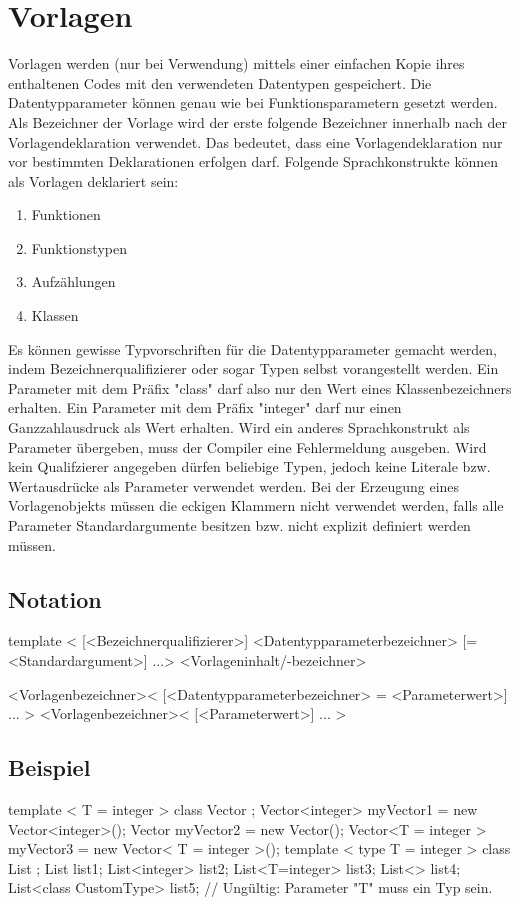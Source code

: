 \chapter{Vorlagen}
Vorlagen werden (nur bei Verwendung) mittels einer einfachen Kopie ihres enthaltenen Codes mit den verwendeten Datentypen gespeichert.
Die Datentypparameter können genau wie bei Funktionsparametern gesetzt werden.
Als Bezeichner der Vorlage wird der erste folgende Bezeichner innerhalb nach der Vorlagendeklaration verwendet.
Das bedeutet, dass eine Vorlagendeklaration nur vor bestimmten Deklarationen erfolgen darf.
Folgende Sprachkonstrukte können als Vorlagen deklariert sein:
\begin{enumerate}
\item Funktionen
\item Funktionstypen
\item Aufzählungen
\item Klassen
\end{enumerate}

Es können gewisse Typvorschriften für die Datentypparameter gemacht werden, indem Bezeichnerqualifizierer oder sogar Typen selbst vorangestellt werden.
Ein Parameter mit dem Präfix "class" darf also nur den Wert eines Klassenbezeichners erhalten.
Ein Parameter mit dem Präfix "integer" darf nur einen Ganzzahlausdruck als Wert erhalten.
Wird ein anderes Sprachkonstrukt als Parameter übergeben, muss der Compiler eine Fehlermeldung ausgeben.
Wird kein Qualifzierer angegeben dürfen beliebige Typen, jedoch keine Literale bzw. Wertausdrücke als Parameter verwendet werden.
Bei der Erzeugung eines Vorlagenobjekts müssen die eckigen Klammern nicht verwendet werden, falls alle Parameter Standardargumente besitzen bzw.
nicht explizit definiert werden müssen.

\section{Notation}
template < [<Bezeichnerqualifizierer>] <Datentypparameterbezeichner> [= <Standardargument>] ...> <Vorlageninhalt/-bezeichner>

<Vorlagenbezeichner>< [<Datentypparameterbezeichner> = <Parameterwert>] ... >
<Vorlagenbezeichner>< [<Parameterwert>] ... >

\section{Beispiel}
template < T = integer > class Vector {};
Vector<integer> myVector1 = new Vector<integer>();
Vector myVector2 = new Vector();
Vector<T = integer > myVector3 = new Vector< T = integer >();
template < type T = integer > class List {};
List list1;
List<integer> list2;
List<T=integer> list3;
List<> list4;
List<class CustomType> list5; // Ungültig: Parameter "T" muss ein Typ sein.